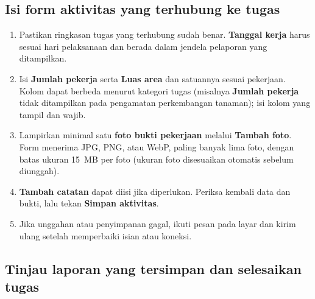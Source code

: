 


\subsection{Isi form aktivitas yang terhubung ke tugas}

\begin{enumerate}
  \item Pastikan ringkasan tugas yang terhubung sudah benar. \textbf{Tanggal kerja} harus sesuai hari pelaksanaan dan berada dalam jendela pelaporan yang ditampilkan.
  \item Isi \textbf{Jumlah pekerja} serta \textbf{Luas area} dan satuannya sesuai pekerjaan. Kolom dapat berbeda menurut kategori tugas (misalnya \textbf{Jumlah pekerja} tidak ditampilkan pada pengamatan perkembangan tanaman); isi kolom yang tampil dan wajib.
  \item Lampirkan minimal satu \textbf{foto bukti pekerjaan} melalui \textbf{Tambah foto}. Form menerima JPG, PNG, atau WebP, paling banyak lima foto, dengan batas ukuran 15~MB per foto (ukuran foto disesuaikan otomatis sebelum diunggah).
  \item \textbf{Tambah catatan} dapat diisi jika diperlukan. Periksa kembali data dan bukti, lalu tekan \textbf{Simpan aktivitas}.
  \item Jika unggahan atau penyimpanan gagal, ikuti pesan pada layar dan kirim ulang setelah memperbaiki isian atau koneksi.
\end{enumerate}



\subsection{Tinjau laporan yang tersimpan dan selesaikan tugas}

